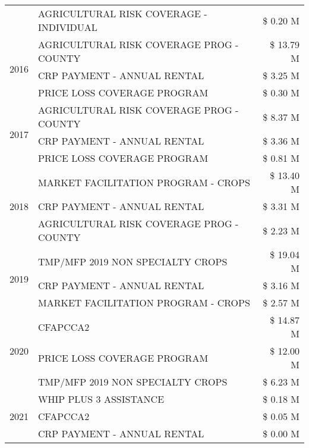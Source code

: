 \begin{tabular}{llr}
 & AGRICULTURAL RISK COVERAGE - INDIVIDUAL & \$ 0.20 M \\
\cline{1-3}
\multirow[t]{3}{*}{2016} & AGRICULTURAL RISK COVERAGE PROG - COUNTY & \$ 13.79 M \\
 & CRP PAYMENT - ANNUAL RENTAL & \$ 3.25 M \\
 & PRICE LOSS COVERAGE PROGRAM & \$ 0.30 M \\
\cline{1-3}
\multirow[t]{3}{*}{2017} & AGRICULTURAL RISK COVERAGE PROG - COUNTY & \$ 8.37 M \\
 & CRP PAYMENT - ANNUAL RENTAL & \$ 3.36 M \\
 & PRICE LOSS COVERAGE PROGRAM & \$ 0.81 M \\
\cline{1-3}
\multirow[t]{3}{*}{2018} & MARKET FACILITATION PROGRAM - CROPS & \$ 13.40 M \\
 & CRP PAYMENT - ANNUAL RENTAL & \$ 3.31 M \\
 & AGRICULTURAL RISK COVERAGE PROG - COUNTY & \$ 2.23 M \\
\cline{1-3}
\multirow[t]{3}{*}{2019} & TMP/MFP 2019 NON SPECIALTY CROPS & \$ 19.04 M \\
 & CRP PAYMENT - ANNUAL RENTAL & \$ 3.16 M \\
 & MARKET FACILITATION PROGRAM - CROPS & \$ 2.57 M \\
\cline{1-3}
\multirow[t]{3}{*}{2020} & CFAPCCA2 & \$ 14.87 M \\
 & PRICE LOSS COVERAGE PROGRAM & \$ 12.00 M \\
 & TMP/MFP 2019 NON SPECIALTY CROPS & \$ 6.23 M \\
\cline{1-3}
\multirow[t]{3}{*}{2021} & WHIP PLUS 3 ASSISTANCE & \$ 0.18 M \\
 & CFAPCCA2 & \$ 0.05 M \\
 & CRP PAYMENT - ANNUAL RENTAL & \$ 0.00 M \\
\cline{1-3}
\bottomrule
\end{tabular}

